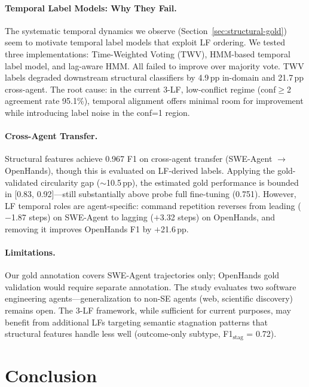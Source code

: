 \documentclass[11pt,a4paper]{article}
\begin{document}
\paragraph{Temporal Label Models: Why They Fail.}
The systematic temporal dynamics we observe (Section~\ref{sec:structural-gold}) seem to motivate temporal label models that exploit LF ordering.
We tested three implementations: Time-Weighted Voting (TWV), HMM-based temporal label model, and lag-aware HMM.
All failed to improve over majority vote.
TWV labels degraded downstream structural classifiers by 4.9\,pp in-domain and 21.7\,pp cross-agent.
The root cause: in the current 3-LF, low-conflict regime (conf$\geq$2 agreement rate 95.1\%), temporal alignment offers minimal room for improvement while introducing label noise in the conf=1 region.

\paragraph{Cross-Agent Transfer.}
Structural features achieve 0.967 F1 on cross-agent transfer (SWE-Agent $\rightarrow$ OpenHands), though this is evaluated on LF-derived labels.
Applying the gold-validated circularity gap ($\sim$10.5\,pp), the estimated gold performance is bounded in [0.83, 0.92]---still substantially above probe full fine-tuning (0.751).
However, LF temporal roles are agent-specific: command repetition reverses from leading ($-$1.87 steps) on SWE-Agent to lagging ($+$3.32 steps) on OpenHands, and removing it improves OpenHands F1 by $+$21.6\,pp.

\paragraph{Limitations.}
Our gold annotation covers SWE-Agent trajectories only; OpenHands gold validation would require separate annotation.
The study evaluates two software engineering agents---generalization to non-SE agents (web, scientific discovery) remains open.
The 3-LF framework, while sufficient for current purposes, may benefit from additional LFs targeting semantic stagnation patterns that structural features handle less well (outcome-only subtype, F1$_\text{stag}$ = 0.72).

\section{Conclusion}
\end{document}
